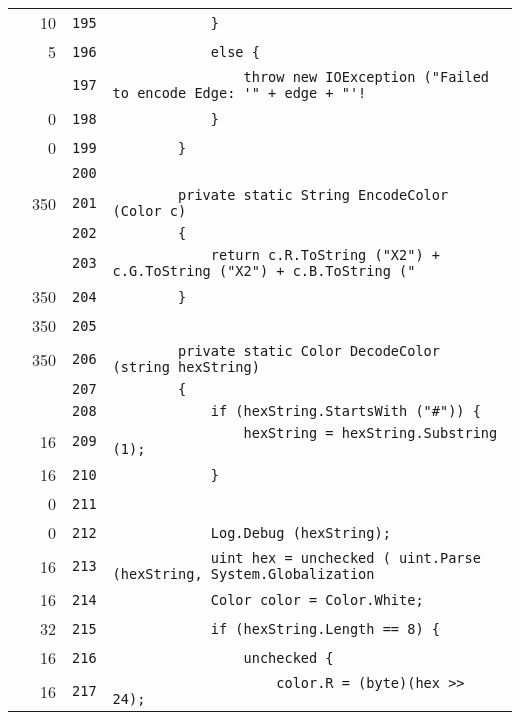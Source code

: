 \documentclass[a4paper,10pt]{article}
\begin{document}
\begin{longtable}[l]{lrrl}
\cellcolor{green} & 10 & \verb~195~ & \verb~            }~\\
\cellcolor{green} & 5 & \verb~196~ & \verb~            else {~\\
\cellcolor{gray} &  & \verb~197~ & \verb~                throw new IOException ("Failed to encode Edge: '" + edge + "'!~\\
\cellcolor{red} & 0 & \verb~198~ & \verb~            }~\\
\cellcolor{red} & 0 & \verb~199~ & \verb~        }~\\
\cellcolor{gray} &  & \verb~200~ & \verb~~\\
\cellcolor{green} & 350 & \verb~201~ & \verb~        private static String EncodeColor (Color c)~\\
\cellcolor{gray} &  & \verb~202~ & \verb~        {~\\
\cellcolor{gray} &  & \verb~203~ & \verb~            return c.R.ToString ("X2") + c.G.ToString ("X2") + c.B.ToString ("~\\
\cellcolor{green} & 350 & \verb~204~ & \verb~        }~\\
\cellcolor{green} & 350 & \verb~205~ & \verb~~\\
\cellcolor{green} & 350 & \verb~206~ & \verb~        private static Color DecodeColor (string hexString)~\\
\cellcolor{gray} &  & \verb~207~ & \verb~        {~\\
\cellcolor{gray} &  & \verb~208~ & \verb~            if (hexString.StartsWith ("#")) {~\\
\cellcolor{green} & 16 & \verb~209~ & \verb~                hexString = hexString.Substring (1);~\\
\cellcolor{green} & 16 & \verb~210~ & \verb~            }~\\
\cellcolor{red} & 0 & \verb~211~ & \verb~~\\
\cellcolor{red} & 0 & \verb~212~ & \verb~            Log.Debug (hexString);~\\
\cellcolor{green} & 16 & \verb~213~ & \verb~            uint hex = unchecked ( uint.Parse (hexString, System.Globalization~\\
\cellcolor{green} & 16 & \verb~214~ & \verb~            Color color = Color.White;~\\
\cellcolor{green} & 32 & \verb~215~ & \verb~            if (hexString.Length == 8) {~\\
\cellcolor{green} & 16 & \verb~216~ & \verb~                unchecked {~\\
\cellcolor{green} & 16 & \verb~217~ & \verb~                    color.R = (byte)(hex >> 24);~\\

\end{longtable}
\end{document}
